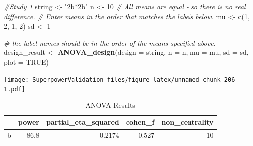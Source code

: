 \documentclass[]{book}
\newenvironment{Shaded}{\begin{snugshade}}{\end{snugshade}}
\newcommand{\CommentTok}[1]{\textcolor[rgb]{0.56,0.35,0.01}{\textit{#1}}}
\newcommand{\DataTypeTok}[1]{\textcolor[rgb]{0.13,0.29,0.53}{#1}}
\newcommand{\DecValTok}[1]{\textcolor[rgb]{0.00,0.00,0.81}{#1}}
\newcommand{\FloatTok}[1]{\textcolor[rgb]{0.00,0.00,0.81}{#1}}
\newcommand{\KeywordTok}[1]{\textcolor[rgb]{0.13,0.29,0.53}{\textbf{#1}}}
\newcommand{\NormalTok}[1]{#1}
\newcommand{\OperatorTok}[1]{\textcolor[rgb]{0.81,0.36,0.00}{\textbf{#1}}}
\newcommand{\OtherTok}[1]{\textcolor[rgb]{0.56,0.35,0.01}{#1}}
\newcommand{\StringTok}[1]{\textcolor[rgb]{0.31,0.60,0.02}{#1}}
\begin{document}
\begin{Shaded}
\begin{Highlighting}[]
\CommentTok{#Study 1}
\NormalTok{string <-}\StringTok{ "2b*2b"}
\NormalTok{n <-}\StringTok{ }\DecValTok{10}
\CommentTok{# All means are equal - so there is no real difference.}
\CommentTok{# Enter means in the order that matches the labels below.}
\NormalTok{mu <-}\StringTok{ }\KeywordTok{c}\NormalTok{(}\DecValTok{1}\NormalTok{, }\DecValTok{2}\NormalTok{, }\DecValTok{1}\NormalTok{, }\DecValTok{2}\NormalTok{) }
\NormalTok{sd <-}\StringTok{ }\DecValTok{1}

\CommentTok{# the label names should be in the order of the means specified above.}
\NormalTok{design_result <-}\StringTok{ }\KeywordTok{ANOVA_design}\NormalTok{(}\DataTypeTok{design =}\NormalTok{ string,}
                   \DataTypeTok{n =}\NormalTok{ n, }
                   \DataTypeTok{mu =}\NormalTok{ mu, }
                   \DataTypeTok{sd =}\NormalTok{ sd, }
                   \DataTypeTok{plot =} \OtherTok{TRUE}\NormalTok{)}
\end{Highlighting}
\end{Shaded}

\texttt{[image: SuperpowerValidation\_files/figure-latex/unnamed-chunk-206-1.pdf]}

\begin{Shaded}
\end{Shaded}

\begin{table}[t]

\caption{\label{tab:unnamed-chunk-206}ANOVA Results}
\centering
\begin{tabular}{l|r|r|r|r}
\hline
  & power & partial\_eta\_squared & cohen\_f & non\_centrality\\
\hline
b & 86.8 & 0.2174 & 0.527 & 10\\
\hline
\end{tabular}
\end{table}
\end{document}
